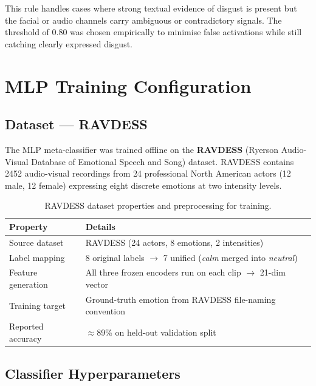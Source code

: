 \documentclass[12pt,a4paper]{article}
\begin{document}
This rule handles cases where strong textual evidence of disgust is present
but the facial or audio channels carry ambiguous or contradictory signals.
The threshold of 0.80 was chosen empirically to minimise false activations
while still catching clearly expressed disgust.

\section{MLP Training Configuration}
\label{sec:training}

\subsection{Dataset — RAVDESS}

The MLP meta-classifier was trained offline on the
\textbf{RAVDESS} (Ryerson Audio-Visual Database of Emotional Speech and Song)
dataset. RAVDESS contains 2452 audio-visual recordings from 24 professional
North American actors (12 male, 12 female) expressing eight discrete emotions
at two intensity levels.

\begin{table}[H]
\centering
\caption{RAVDESS dataset properties and preprocessing for training.}
\label{tab:ravdess}
\begin{tabular}{ll}
\toprule
\textbf{Property} & \textbf{Details} \\
\midrule
Source dataset & RAVDESS (24 actors, 8 emotions, 2 intensities) \\
Label mapping & 8 original labels $\rightarrow$ 7 unified (\textit{calm} merged into \textit{neutral}) \\
Feature generation & All three frozen encoders run on each clip $\rightarrow$ 21-dim vector \\
Training target & Ground-truth emotion from RAVDESS file-naming convention \\
Reported accuracy & $\approx$89\% on held-out validation split \\
\bottomrule
\end{tabular}
\end{table}

\subsection{Classifier Hyperparameters}
\end{document}
